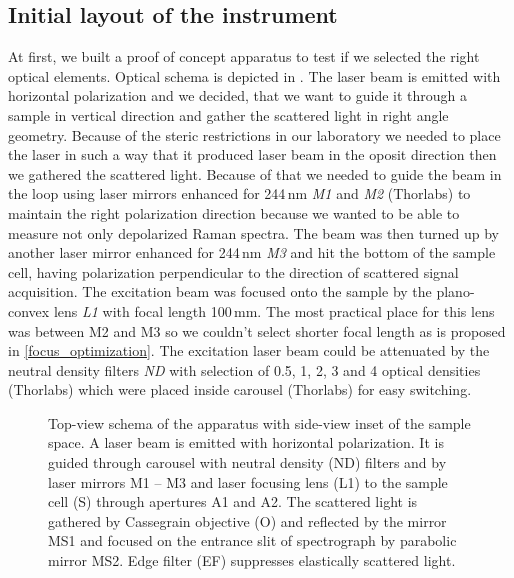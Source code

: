 \subsection{Initial layout of the instrument}

At first, we built a proof of concept apparatus to test if we selected the
right optical elements. Optical schema is depicted in
.
The laser beam is emitted with horizontal polarization and we decided, that we
want to guide it through a sample in vertical direction and gather the
scattered light in right angle geometry. Because of the steric restrictions in
our laboratory we needed to place the laser in such a way that it produced
laser beam in the oposit direction then we gathered the scattered light.
Because of that we needed to guide the beam in the loop using laser mirrors
enhanced for 244\,nm \emph{M1} and \emph{M2} (Thorlabs) to maintain the right
polarization direction because we wanted to be able to measure not only
depolarized Raman spectra. The beam was then turned up by another laser mirror
enhanced for 244\,nm \emph{M3} and hit the bottom of the sample cell, having
polarization perpendicular to the direction of scattered signal acquisition.
The excitation beam was focused onto the sample by the plano-convex lens
\emph{L1} with focal length 100\,mm. The most practical place for this lens
was between M2 and M3 so we couldn't select shorter focal length as is proposed
in \cref{focus_optimization}. The excitation laser beam could be attenuated by
the neutral density filters \emph{ND} with selection of 0.5, 1, 2, 3 and 4
optical densities (Thorlabs) which were placed inside carousel (Thorlabs) for
easy switching.

\begin{figure}
	\centering
	
	\caption{Top-view schema of the apparatus with side-view inset of the sample
		space. A laser beam is emitted with horizontal polarization. It is guided
		through carousel with neutral density (ND) filters and by laser mirrors
		M1 -- M3 and laser focusing lens (L1) to the sample cell (S) through
		apertures A1 and A2. The scattered light is gathered by Cassegrain
		objective (O) and reflected by the mirror MS1 and focused on the entrance
		slit of spectrograph by parabolic mirror MS2. Edge filter (EF) suppresses
		elastically scattered light.}
	\label{\figlabel{initial_layout:aparatus_schema}}
\end{figure}

